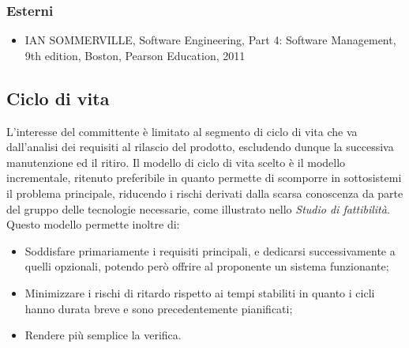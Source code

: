 \subsubsection{Esterni}
\begin{itemize}
\item IAN SOMMERVILLE, Software Engineering, Part 4: Software Management, 9th edition, Boston, Pearson Education, 2011
\end{itemize}

\subsection{Ciclo di vita}
L’interesse del committente è limitato al segmento di ciclo di vita che va dall’analisi dei requisiti al
rilascio del prodotto, escludendo dunque la successiva manutenzione ed il ritiro. Il modello di ciclo di
vita scelto è il modello incrementale, ritenuto preferibile in quanto permette di scomporre in sottosistemi
il problema principale, riducendo i rischi derivati dalla scarsa conoscenza da parte del gruppo delle
tecnologie necessarie, come illustrato nello \textit{Studio di fattibilità}. Questo modello permette inoltre di:
\begin{itemize}
\item Soddisfare primariamente i requisiti principali, e dedicarsi successivamente a quelli opzionali,
potendo però offrire al proponente un sistema funzionante;
\item Minimizzare i rischi di ritardo rispetto ai tempi stabiliti in quanto i cicli hanno durata breve e
sono precedentemente pianificati;
\item Rendere più semplice la verifica.
\end{itemize}
